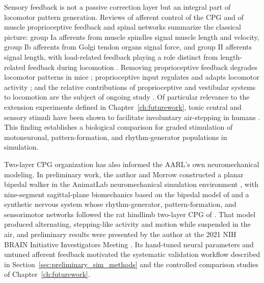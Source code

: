 Sensory feedback is not a passive correction layer but an integral part of locomotor pattern generation. Reviews of afferent control of the CPG \citep{van_de_crommert_review_1998} and of muscle proprioceptive feedback and spinal networks \citep{windhorst_muscle_2007, windhorst_spinal_2022} summarize the classical picture: group Ia afferents from muscle spindles signal muscle length and velocity, group Ib afferents from Golgi tendon organs signal force, and group II afferents signal length, with load-related feedback playing a role distinct from length-related feedback during locomotion \citep{dietz_significance_2000}. Removing proprioceptive feedback degrades locomotor patterns in mice \citep{akay_degradation_2014}; proprioceptive input regulates and adapts locomotor activity \citep{lam_role_2002}; and the relative contributions of proprioceptive and vestibular systems to locomotion are the subject of ongoing study \citep{akay_relative_2021, akay_sensory_2020}. Of particular relevance to the extension experiments defined in Chapter~\ref{ch:futurework}, tonic central and sensory stimuli have been shown to facilitate involuntary air-stepping in humans \citep{selionov_tonic_2009}. This finding establishes a biological comparison for graded stimulation of motoneuronal, pattern-formation, and rhythm-generator populations in simulation.

Two-layer CPG organization has also informed the AARL's own neuromechanical modeling. In preliminary work, the author and Morrow constructed a planar bipedal walker in the AnimatLab neuromechanical simulation environment \citep{cofer_animatlab_2010}, with nine-segment sagittal-plane biomechanics based on the bipedal model of \citet{li_bipedal_2017} and a synthetic nervous system whose rhythm-generator, pattern-formation, and sensorimotor networks followed the rat hindlimb two-layer CPG of \citet{deng_neuromechanical_2019}. That model produced alternating, stepping-like activity and motion while suspended in the air, and preliminary results were presented by the author at the 2021 NIH BRAIN Initiative Investigators Meeting \citep{bolenTorqueValuesArtificialKnee2021June15-17}. Its hand-tuned neural parameters and untuned afferent feedback motivated the systematic validation workflow described in Section~\ref{sec:preliminary_sim_methods} and the controlled comparison studies of Chapter~\ref{ch:futurework}.

